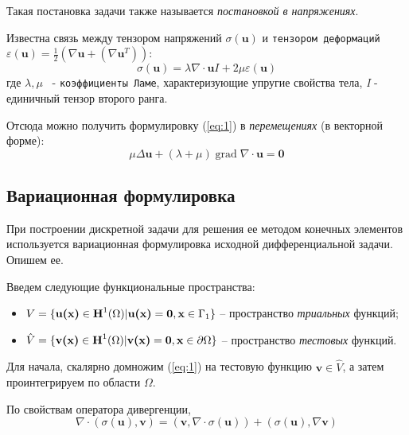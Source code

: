 \documentclass[a4paper, 14pt]{extreport}
\DeclareMathOperator{\grad}{grad}
\begin{document}
Такая постановка задачи также называется \textit{постановкой в напряжениях}.

Известна связь между тензором напряжений $\sigma(\textbf{u})$ и \texttt{тензором деформаций}
$\varepsilon(\textbf{u}) = \frac{1}{2}(\nabla\textbf{u} + (\nabla\textbf{u}^T))$:
\begin{equation*}
\sigma(\textbf{u}) = \lambda \nabla\!\cdot\!\textbf{u}\textit{I} + 2\mu\varepsilon(\textbf{u})
\end{equation*}
где $\lambda, \mu $ \, - \texttt{коэффициенты Ламе}, характеризующие упругие свойства тела,
\textit{I} - единичный тензор второго ранга.

Отсюда  можно получить формулировку (\ref{eq:1}) в \textit{перемещениях} (в векторной форме):
\begin{equation}
	\label{eq: 2}
	\mu\Delta\textbf{u} + (\lambda + \mu)\grad\!\nabla\!\cdot\!\textbf{u} = \textbf{0}
\end{equation}



\subsection{ Вариационная формулировка}
При построении дискретной задачи для решения ее методом конечных элементов 
используется вариационная формулировка исходной дифференциальной задачи.
Опишем ее.

Введем следующие функциональные пространства:
\begin{itemize}
	\item $V = \{ \textbf{u(\textbf{x})} \in \textbf{H}^1(\Omega) \vert \textbf{u(\textbf{x})} = \textbf{0}, \textbf{x} \in \Gamma_1 \}$ --
	пространство \textit{триальных} функций;
	\item $\hat{V} = \{ \textbf{v(\textbf{x})} \in \textbf{H}^1(\Omega) \vert \textbf{v(\textbf{x})} = \textbf{0}, \textbf{x} \in \partial\Omega \}$ --
	пространство \textit{тестовых} функций.	
\end{itemize}

Для начала, скалярно домножим (\ref{eq:1}) на тестовую функцию $\textbf{v} \in \hat{V}$, 
а затем проинтегрируем по области $\Omega$.

По свойствам оператора дивергенции,
\begin{equation}
	\label{eq: 3}
	\nabla\!\cdot\!(\sigma(\textbf{u}), \textbf{v}) = (\textbf{v}, \nabla\!\cdot\!\sigma(\textbf{u})) +
		(\sigma(\textbf{u}), \nabla\textbf{v})
\end{equation}
\end{document}
